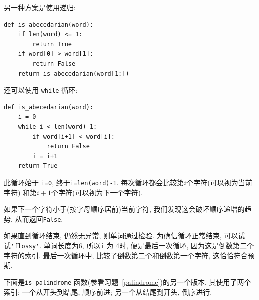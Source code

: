 \documentclass[10pt]{book}
\begin{document}
另一种方案是使用递归:

\begin{verbatim}
def is_abecedarian(word):
    if len(word) <= 1:
        return True
    if word[0] > word[1]:
        return False
    return is_abecedarian(word[1:])
\end{verbatim}

还可以使用 {\tt while} 循环:

\begin{verbatim}
def is_abecedarian(word):
    i = 0
    while i < len(word)-1:
        if word[i+1] < word[i]:
            return False
        i = i+1
    return True
\end{verbatim}
%
此循环始于 {\tt i=0}, 终于{\tt i=len(word)-1}. 
每次循环都会比较第$i$个字符(可以视为当前字符)
和第$i+1$个字符(可以视为下一个字符). 

如果下一个字符小于(按字母顺序居前)当前字符, 
我们发现这会破坏顺序递增的趋势, 从而返回{\tt False}.

如果直到循环结束, 仍然无异常, 则单词通过检验. 
为确信循环正常结束, 可以试试\verb"'flossy'". 
单词长度为6, 所以{\tt i} 为 4时, 便是最后一次循环, 
因为这是倒数第二个字符的索引. 最后一次循环中, 
比较了倒数第二个和倒数第一个字符, 这恰恰符合预期. 

下面是\verb"is_palindrome" 函数(参看习题~\ref{palindrome})的另一个版本, 
其使用了两个索引; 一个从开头到结尾, 顺序前进;
另一个从结尾到开头, 倒序进行.
\end{document}
